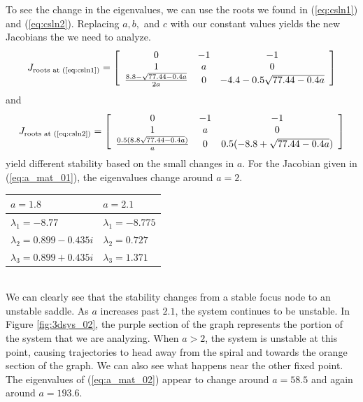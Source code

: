 \documentclass{article}
\begin{document}
To see the change  in the eigenvalues, we can use the roots we found in (\ref{eq:csln1}) and (\ref{eq:csln2}). Replacing $a,b,$ and $c$ with our constant values yields the new Jacobians the we need to analyze.
\begin{equation}
	J_{\text{roots at (\ref{eq:csln1})}}=
	\left[
	\begin{array}{c c c}
		0                                  & -1 & -1                        \\
		1                                  & a  & 0                         \\
		\frac{8.8-\sqrt{77.44 - 0.4a}}{2a} & 0  & -4.4-0.5\sqrt{77.44-0.4a}
	\end{array}
	\right]\label{eq:a_mat_01}
\end{equation}
\noindent and
\begin{equation}
	J_{\text{roots at (\ref{eq:csln2})}} =
	\left[
	\begin{array}{c c c}
		0                                   & -1 & -1                          \\
		1                                   & a  & 0                           \\
		\frac{0.5(8.8\sqrt{77.44-0.4a})}{a} & 0  & 0.5(-8.8+\sqrt{77.44-0.4a})
	\end{array}
	\right]\label{eq:a_mat_02}
\end{equation}
\noindent yield different stability based on the small changes in $a$. For the Jacobian given in (\ref{eq:a_mat_01}), the eigenvalues change around $a=2$.
\begin{center}
	\begin{tabular}{l | l}
		$a=1.8$                      & $a=2.1$              \\
		\hline
		$\lambda_{1}=-8.77$          & $\lambda_{1}=-8.775$ \\
		$\lambda_{2}=0.899-0.435i$   & $\lambda_{2}=0.727$  \\
		$\lambda_{3}=0.899 + 0.435i$ & $\lambda_{3}=1.371$
	\end{tabular}
\end{center}
\noindent\\
\noindent We can clearly see that the stability changes from a stable focus node to an unstable saddle. As $a$ increases past $2.1$, the system continues to be unstable. In Figure \ref{fig:3dsys_02}, the purple section of the graph represents the portion of the system that we are analyzing. When $a>2$, the system is unstable at this point, causing trajectories to head away from the spiral and towards the orange section of the graph. We can also see what happens near the other fixed point. The eigenvalues of (\ref{eq:a_mat_02}) appear to change around $a=58.5$ and again around $a=193.6$.
\end{document}
